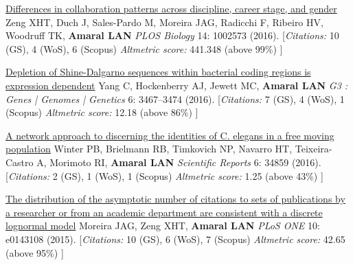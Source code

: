 \NumberedItem{\makebox[0.8cm][r]{[118]}}
\href{/people/amaral/differences-collaboration-patterns-across-discipline-career-stage-and-gender}
{Differences in collaboration patterns across discipline, career stage, and gender}
\newline
Zeng XHT, Duch J, Sales-Pardo M, Moreira JAG, Radicchi F, Ribeiro HV, Woodruff TK, {\textbf{Amaral LAN}}
\newline
\textit{PLOS Biology}
    14:
1002573 (2016).
    \newline
    \hfill [{\em{Citations:}} 10 (GS),
    4 (WoS), 6 (Scopus)
        {\hspace*{1cm} \em{Altmetric score:}}  441.348 (above 99\%)
    ]
\newline
\Gap
~
\Gap

\NumberedItem{\makebox[0.8cm][r]{[117]}}
\href{/people/amaral/depletion-shine-dalgarno-sequences-within-bacterial-coding-regions-expression-dependent}
{Depletion of Shine-Dalgarno sequences within bacterial coding regions is expression dependent}
\newline
Yang C, Hockenberry AJ, Jewett MC, {\textbf{Amaral LAN}}
\newline
\textit{G3 : Genes | Genomes | Genetics}
    6:
3467--3474 (2016).
    \newline
    \hfill [{\em{Citations:}} 7 (GS),
    4 (WoS), 1 (Scopus)
        {\hspace*{1cm} \em{Altmetric score:}}  12.18 (above 86\%)
    ]
\newline
\Gap
~
\Gap

\NumberedItem{\makebox[0.8cm][r]{[116]}}
\href{/people/amaral/network-approach-discerning-identities-c-elegans-free-moving-population}
{A network approach to discerning the identities of C. elegans in a free moving population}
\newline
Winter PB, Brielmann RB, Timkovich NP, Navarro HT, Teixeira-Castro A, Morimoto RI, {\textbf{Amaral LAN}}
\newline
\textit{Scientific Reports}
    6:
34859 (2016).
    \newline
    \hfill [{\em{Citations:}} 2 (GS),
    1 (WoS), 1 (Scopus)
        {\hspace*{1cm} \em{Altmetric score:}}  1.25 (above 43\%)
    ]
\newline
\Gap
~
\Gap

\NumberedItem{\makebox[0.8cm][r]{[115]}}
\href{/people/amaral/distribution-asymptotic-number-citations-sets-publications-researcher-or-academic-department-are-consistent-discrete-lognormal-model}
{The distribution of the asymptotic number of citations to sets of  publications by a researcher or from an academic department are consistent with a discrete lognormal model}
\newline
Moreira JAG, Zeng XHT, {\textbf{Amaral LAN}}
\newline
\textit{PLoS ONE}
    10:
e0143108 (2015).
    \newline
    \hfill [{\em{Citations:}} 10 (GS),
    6 (WoS), 7 (Scopus)
        {\hspace*{1cm} \em{Altmetric score:}}  42.65 (above 95\%)
    ]
\newline
\Gap
~
\Gap

